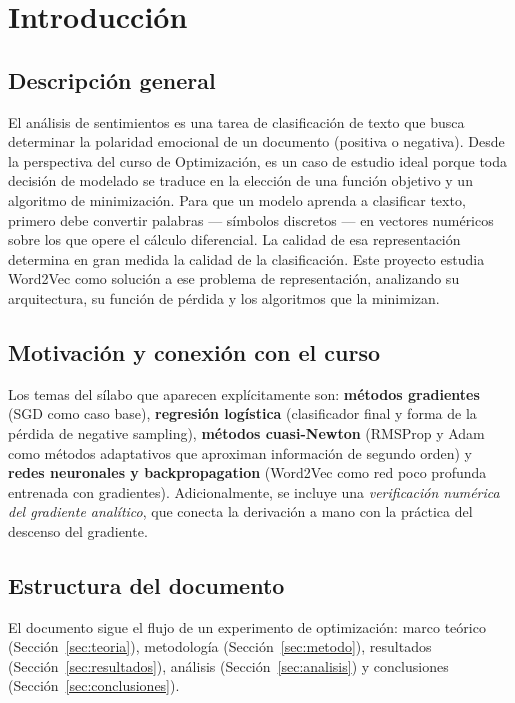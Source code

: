 \documentclass[11pt]{article}
\begin{document}
\tableofcontents
\newpage

\section{Introducción}

\subsection{Descripción general}
El análisis de sentimientos es una tarea de clasificación de texto que busca determinar la
polaridad emocional de un documento (positiva o negativa). Desde la perspectiva del curso de
Optimización, es un caso de estudio ideal porque toda decisión de modelado se traduce en la
elección de una función objetivo y un algoritmo de minimización. Para que un modelo aprenda
a clasificar texto, primero debe convertir palabras --- símbolos discretos --- en vectores
numéricos sobre los que opere el cálculo diferencial. La calidad de esa representación
determina en gran medida la calidad de la clasificación. Este proyecto estudia Word2Vec como
solución a ese problema de representación, analizando su arquitectura, su función de pérdida
y los algoritmos que la minimizan.

\subsection{Motivación y conexión con el curso}
Los temas del sílabo que aparecen explícitamente son: \textbf{métodos gradientes} (SGD como
caso base), \textbf{regresión logística} (clasificador final y forma de la pérdida de
negative sampling), \textbf{métodos cuasi-Newton} (RMSProp y Adam como métodos adaptativos
que aproximan información de segundo orden) y \textbf{redes neuronales y backpropagation}
(Word2Vec como red poco profunda entrenada con gradientes). Adicionalmente, se incluye una
\emph{verificación numérica del gradiente analítico}, que conecta la derivación a mano con
la práctica del descenso del gradiente.

\subsection{Estructura del documento}
El documento sigue el flujo de un experimento de optimización: marco teórico
(Sección~\ref{sec:teoria}), metodología (Sección~\ref{sec:metodo}), resultados
(Sección~\ref{sec:resultados}), análisis (Sección~\ref{sec:analisis}) y conclusiones
(Sección~\ref{sec:conclusiones}).
\end{document}
